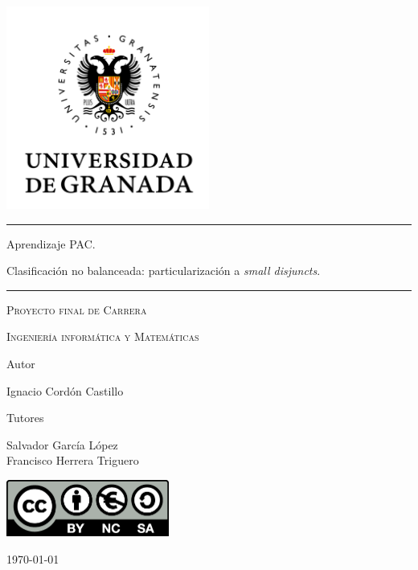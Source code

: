 
\begin{titlepage}
 \centering
 \includegraphics[width=0.5\textwidth]{./imgs/ugr.png}\par
 \rule{\textwidth}{0.3em}\hfill
 {\huge 
   Aprendizaje PAC. \par
   Clasificación no balanceada:
   particularización a \textit{small disjuncts}.\par}
 \rule{\textwidth}{0.3em}\hfill
 \vspace{1cm}
 {\scshape Proyecto final de Carrera\par}
 {\scshape Ingeniería informática y Matemáticas\par}
 \vfill
 {Autor \par}
   {Ignacio Cordón Castillo \par}
 {Tutores \par}
   {Salvador García López \\
    Francisco Herrera Triguero \par}
 \vfill
 \includegraphics[width=0.4\textwidth]{./imgs/by-nc-sa.png}\par
 {\large \today\par}
\end{titlepage}